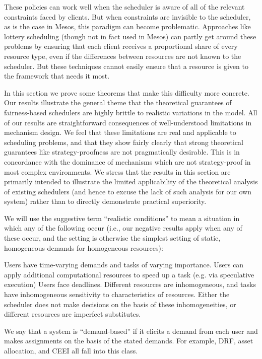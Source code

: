 \documentclass{acm_proc_article-sp}
\begin{document}
These policies can work well when the scheduler is aware of all of the relevant constraints faced by clients. But when constraints are invisible to the scheduler, as is the case in Mesos, this paradigm can become problematic. Approaches like lottery scheduling (though not in fact used in Mesos) can partly get around these problems by ensuring that each client receives a proportional share of every resource type, even if the differences between resources are not known to the scheduler. But these techniques cannot easily ensure that a resource is given to the framework that needs it most.

In this section we prove some theorems that make this difficulty more concrete. Our results illustrate the general theme that the theoretical guarantees of fairness-based schedulers are highly brittle to realistic variations in the model. All of our results are straightforward consequences of well-understood limitations in mechanism design. We feel that these limitations are real and applicable to scheduling problems, and that they show fairly clearly that strong theoretical guarantees like strategy-proofness are not pragmatically desirable. This is in concordance with the dominance of mechanisms which are not strategy-proof in most complex environments. We stress that the results in this section are primarily intended to illustrate the limited applicability of the theoretical analysis of existing schedulers (and hence to excuse the lack of such analysis for our own system) rather than to directly demonstrate practical superiority.

We will use the suggestive term “realistic conditions” to mean a situation in which any of the following occur (i.e., our negative results apply when any of these occur, and the setting is otherwise the simplest setting of static, homogeneous demands for homogeneous resources):

Users have time-varying demands and tasks of varying importance.
Users can apply additional computational resources to speed up a task (e.g. via speculative execution)
Users face deadlines.
Different resources are inhomogeneous, and tasks have inhomogeneous sensitivity to characteristics of resources. Either the scheduler does not make decisions on the basis of these inhomogeneities, or different resources are imperfect substitutes.

We say that a system is “demand-based” if it elicits a demand from each user and makes assignments on the basis of the stated demands. For example, DRF, asset allocation, and CEEI all fall into this class.
\end{document}
